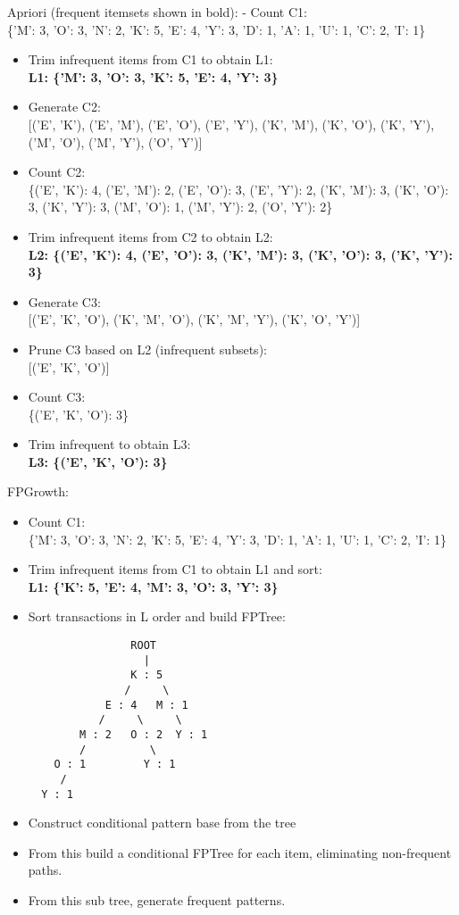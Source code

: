 \documentclass[11pt]{article}
\begin{document}
    Apriori (frequent itemsets shown in bold): - Count C1:\\
\{'M': 3, 'O': 3, 'N': 2, 'K': 5, 'E': 4, 'Y': 3, 'D': 1, 'A': 1, 'U':
1, 'C': 2, 'I': 1\}

\begin{itemize}
\item
  Trim infrequent items from C1 to obtain L1:\\
  \textbf{L1: \{'M': 3, 'O': 3, 'K': 5, 'E': 4, 'Y': 3\}}
\item
  Generate C2:\\
  {[}('E', 'K'), ('E', 'M'), ('E', 'O'), ('E', 'Y'), ('K', 'M'), ('K',
  'O'), ('K', 'Y'), ('M', 'O'), ('M', 'Y'), ('O', 'Y'){]}
\item
  Count C2:\\
  \{('E', 'K'): 4, ('E', 'M'): 2, ('E', 'O'): 3, ('E', 'Y'): 2, ('K',
  'M'): 3, ('K', 'O'): 3, ('K', 'Y'): 3, ('M', 'O'): 1, ('M', 'Y'): 2,
  ('O', 'Y'): 2\}
\item
  Trim infrequent items from C2 to obtain L2:\\
  \textbf{L2: \{('E', 'K'): 4, ('E', 'O'): 3, ('K', 'M'): 3, ('K', 'O'):
  3, ('K', 'Y'): 3\}}
\item
  Generate C3:\\
  {[}('E', 'K', 'O'), ('K', 'M', 'O'), ('K', 'M', 'Y'), ('K', 'O',
  'Y'){]}
\item
  Prune C3 based on L2 (infrequent subsets):\\
  {[}('E', 'K', 'O'){]}
\item
  Count C3:\\
  \{('E', 'K', 'O'): 3\}
\item
  Trim infrequent to obtain L3:\\
  \textbf{L3: \{('E', 'K', 'O'): 3\}}
\end{itemize}

    FPGrowth:

\begin{itemize}
\item
  Count C1:\\
  \{'M': 3, 'O': 3, 'N': 2, 'K': 5, 'E': 4, 'Y': 3, 'D': 1, 'A': 1, 'U':
  1, 'C': 2, 'I': 1\}
\item
  Trim infrequent items from C1 to obtain L1 and sort:\\
  \textbf{L1: \{'K': 5, 'E': 4, 'M': 3, 'O': 3, 'Y': 3\}}
\item
  Sort transactions in L order and build FPTree:

\begin{verbatim}
                ROOT
                  |
                K : 5
               /     \
            E : 4   M : 1
           /     \     \
        M : 2   O : 2  Y : 1 
        /          \
    O : 1         Y : 1
     /
  Y : 1 
\end{verbatim}
\item
  Construct conditional pattern base from the tree
\item
  From this build a conditional FPTree for each item, eliminating
  non-frequent paths.
\item
  From this sub tree, generate frequent patterns.
\end{itemize}
\end{document}

